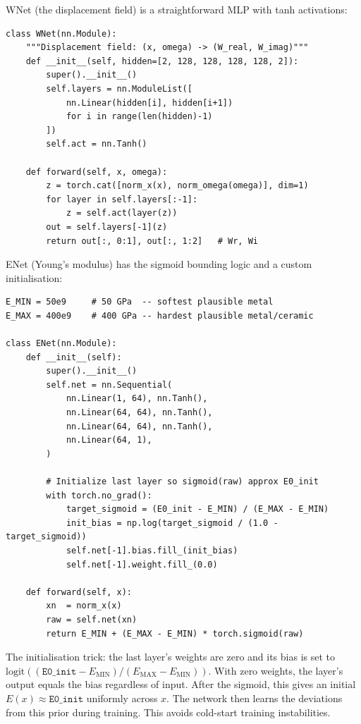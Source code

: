\documentclass[11pt,a4paper]{article}
\begin{document}
WNet (the displacement field) is a straightforward MLP with tanh activations:

\begin{lstlisting}[caption={WNet --- displacement field network}]
class WNet(nn.Module):
    """Displacement field: (x, omega) -> (W_real, W_imag)"""
    def __init__(self, hidden=[2, 128, 128, 128, 128, 2]):
        super().__init__()
        self.layers = nn.ModuleList([
            nn.Linear(hidden[i], hidden[i+1])
            for i in range(len(hidden)-1)
        ])
        self.act = nn.Tanh()

    def forward(self, x, omega):
        z = torch.cat([norm_x(x), norm_omega(omega)], dim=1)
        for layer in self.layers[:-1]:
            z = self.act(layer(z))
        out = self.layers[-1](z)
        return out[:, 0:1], out[:, 1:2]   # Wr, Wi
\end{lstlisting}

ENet (Young's modulus) has the sigmoid bounding logic and a custom initialisation:

\begin{lstlisting}[caption={ENet --- bounded Young's modulus network}]
E_MIN = 50e9     # 50 GPa  -- softest plausible metal
E_MAX = 400e9    # 400 GPa -- hardest plausible metal/ceramic

class ENet(nn.Module):
    def __init__(self):
        super().__init__()
        self.net = nn.Sequential(
            nn.Linear(1, 64), nn.Tanh(),
            nn.Linear(64, 64), nn.Tanh(),
            nn.Linear(64, 64), nn.Tanh(),
            nn.Linear(64, 1),
        )

        # Initialize last layer so sigmoid(raw) approx E0_init
        with torch.no_grad():
            target_sigmoid = (E0_init - E_MIN) / (E_MAX - E_MIN)
            init_bias = np.log(target_sigmoid / (1.0 - target_sigmoid))
            self.net[-1].bias.fill_(init_bias)
            self.net[-1].weight.fill_(0.0)

    def forward(self, x):
        xn  = norm_x(x)
        raw = self.net(xn)
        return E_MIN + (E_MAX - E_MIN) * torch.sigmoid(raw)
\end{lstlisting}

The initialisation trick: the last layer's weights are zero and its bias is set to $\text{logit}((\texttt{E0\_init} - E_\text{MIN}) / (E_\text{MAX} - E_\text{MIN}))$. With zero weights, the layer's output equals the bias regardless of input. After the sigmoid, this gives an initial $E(x) \approx \texttt{E0\_init}$ uniformly across $x$. The network then learns the deviations from this prior during training. This avoids cold-start training instabilities.
\end{document}
